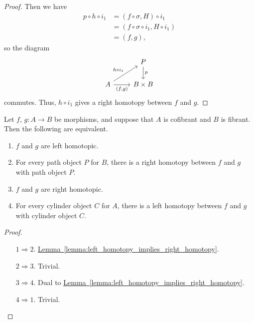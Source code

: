 \documentclass[main.tex]{subfiles}
\begin{document}
\begin{proof}
  Then we have
  \begin{align*}
    p \circ h \circ i_{1} &= (f \circ \sigma, H) \circ i_{1} \\
    &= (f \circ \sigma \circ i_{1}, H \circ i_{1}) \\
    &= (f, g),
  \end{align*}
  so the diagram
  \begin{equation*}
    \begin{tikzcd}
      & P
      \arrow[d, "p"]
      \\
      A
      \arrow[ur, "h \circ i_{1}"]
      \arrow[r, swap, "{(f, g)}"]
      & B \times B
    \end{tikzcd}
  \end{equation*}
  commutes. Thus, $h \circ i_{1}$ gives a right homotopy between $f$ and $g$.
\end{proof}

\begin{corollary}
  Let $f$, $g\colon A \to B$ be morphisms, and suppose that $A$ is cofibrant and $B$ is fibrant. Then the following are equivalent.
  \begin{enumerate}
    \item $f$ and $g$ are left homotopic.

    \item For every path object $P$ for $B$, there is a right homotopy between $f$ and $g$ with path object $P$.

    \item $f$ and $g$ are right homotopic.

    \item For every cylinder object $C$ for $A$, there is a left homotopy between $f$ and $g$ with cylinder object $C$.
  \end{enumerate}
\end{corollary}
\begin{proof}
  \leavevmode
  \begin{itemize}
    \item[$1 \Rightarrow 2$.] \hyperref[lemma:left_homotopy_implies_right_homotopy]{Lemma~\ref*{lemma:left_homotopy_implies_right_homotopy}}.

    \item[$2 \Rightarrow 3$.] Trivial.

    \item[$3 \Rightarrow 4$.] Dual to \hyperref[lemma:left_homotopy_implies_right_homotopy]{Lemma~\ref*{lemma:left_homotopy_implies_right_homotopy}}.

    \item[$4 \Rightarrow 1$.] Trivial.
  \end{itemize}
\end{proof}
\end{document}
